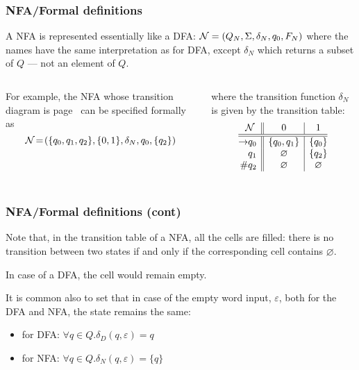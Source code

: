 % 
\begin{frame}
\frametitle{NFA/Formal definitions}

\label{nfa_01_suffix_table}

A NFA is represented essentially like a DFA:
\(
{\cal N} = (Q_N, \Sigma, \delta_N, q_0, F_N)
\)
where the names have the same interpretation as for DFA, except
\(\delta_N\) which returns a subset of \(Q\) --- not an element of
\(Q\).

\bigskip

\begin{columns}

   For example, the NFA whose transition diagram
  is page~\pageref{nfa_01_suffix} can be specified formally as
  \[
    {\cal N} \!=\! (\{q_0, q_1, q_2\}, \{0, 1\}, \delta_N, q_0, \{q_2\})
  \]

   where the transition function \(\delta_N\) is
  given by the transition table:
  \[
  \begin{array}{@{}r@{}l||c|c@{}}
    \multicolumn{2}{c||}{\cal N} & 0 & 1\\
    \hline\hline
    \rightarrow & q_0 & \{q_0, q_1\} & \{q_0\}\\
                & q_1 & \varnothing  & \{q_2\}\\
    \#          & q_2 & \varnothing  & \varnothing
  \end{array}
  \]
\end{columns}

\end{frame}

% 
\begin{frame}
\frametitle{NFA/Formal definitions (cont)}

Note that, in the transition table of a NFA, all the cells are
filled: there is no transition between two states if and only if the
corresponding cell contains \(\varnothing\). 

\bigskip

In case of a DFA, the cell would remain empty.

\bigskip

It is common also to set that in case of the empty word input,
\(\varepsilon\), both for the DFA and NFA, the state remains the
same:
\begin{itemize}

  \item for DFA: \(\forall q \in Q.\delta_D (q, \varepsilon) = q\)

  \item for NFA: \(\forall q \in Q.\delta_N (q, \varepsilon) = \{q\}\)

\end{itemize}

\end{frame}

